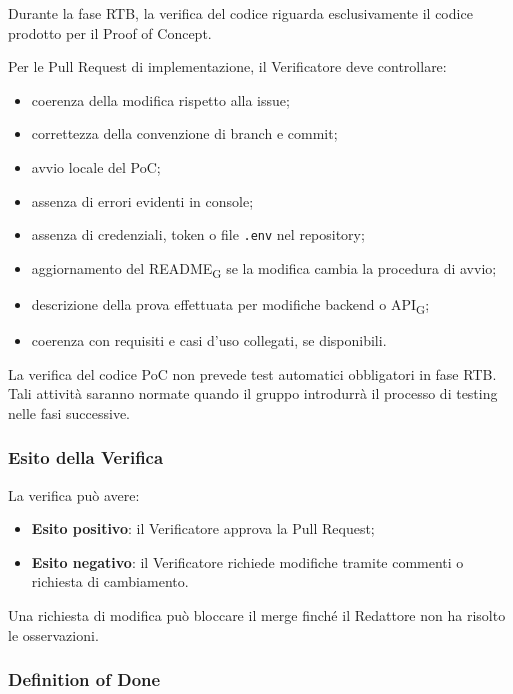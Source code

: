 Durante la fase RTB, la verifica del codice riguarda esclusivamente il codice
prodotto per il Proof of Concept.

Per le Pull Request di implementazione, il Verificatore deve controllare:

\begin{itemize}
    \item coerenza della modifica rispetto alla issue;
    \item correttezza della convenzione di branch e commit;
    \item avvio locale del PoC;
    \item assenza di errori evidenti in console;
    \item assenza di credenziali, token o file \texttt{.env} nel repository;
    \item aggiornamento del README\textsubscript{G} se la modifica cambia la procedura di avvio;
    \item descrizione della prova effettuata per modifiche backend o API\textsubscript{G};
    \item coerenza con requisiti e casi d'uso collegati, se disponibili.
\end{itemize}

La verifica del codice PoC non prevede test automatici obbligatori in fase RTB.
Tali attività saranno normate quando il gruppo introdurrà il processo di testing
nelle fasi successive.


\subsubsection{Esito della Verifica}

La verifica può avere:

\begin{itemize}
    \item \textbf{Esito positivo}: il Verificatore approva la Pull Request;
    \item \textbf{Esito negativo}: il Verificatore richiede modifiche tramite commenti
    o richiesta di cambiamento.
\end{itemize}

Una richiesta di modifica può bloccare il merge finché il Redattore non ha risolto
le osservazioni.


\subsubsection{Definition of Done}
\label{sec:dod}

